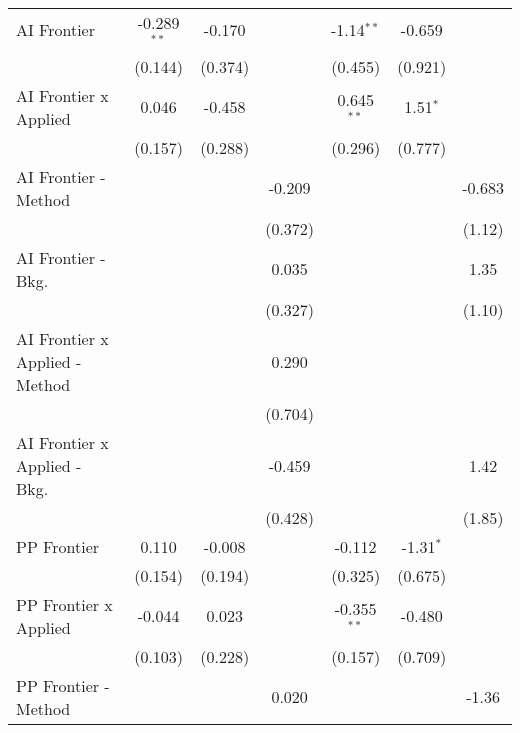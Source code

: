 \begin{tabular}{lcccccc}
   AI Frontier                    & -0.289$^{**}$ & -0.170  &               & -1.14$^{**}$   & -0.659      &   \\   
                                  & (0.144)       & (0.374) &               & (0.455)        & (0.921)     &   \\   
   AI Frontier x Applied          & 0.046         & -0.458  &               & 0.645$^{**}$   & 1.51$^{*}$  &   \\   
                                  & (0.157)       & (0.288) &               & (0.296)        & (0.777)     &   \\   
   AI Frontier - Method           &               &         & -0.209        &                &             & -0.683\\   
                                  &               &         & (0.372)       &                &             & (1.12)\\   
   AI Frontier - Bkg.             &               &         & 0.035         &                &             & 1.35\\   
                                  &               &         & (0.327)       &                &             & (1.10)\\   
   AI Frontier x Applied - Method &               &         & 0.290         &                &             &   \\   
                                  &               &         & (0.704)       &                &             &   \\   
   AI Frontier x Applied - Bkg.   &               &         & -0.459        &                &             & 1.42\\   
                                  &               &         & (0.428)       &                &             & (1.85)\\   
   PP Frontier                    & 0.110         & -0.008  &               & -0.112         & -1.31$^{*}$ &   \\   
                                  & (0.154)       & (0.194) &               & (0.325)        & (0.675)     &   \\   
   PP Frontier x Applied          & -0.044        & 0.023   &               & -0.355$^{**}$  & -0.480      &   \\   
                                  & (0.103)       & (0.228) &               & (0.157)        & (0.709)     &   \\   
   PP Frontier - Method           &               &         & 0.020         &                &             & -1.36\\   

\end{tabular}
